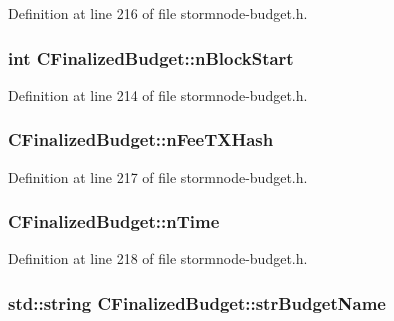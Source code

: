 Definition at line 216 of file stormnode-\/budget.\+h.

\hypertarget{class_c_finalized_budget_a1d04c262e10f4588b17eb3aba5ed9b52}{}
\subsubsection[{n\+Block\+Start}]{\setlength{\rightskip}{0pt plus 5cm}int C\+Finalized\+Budget\+::n\+Block\+Start}\label{class_c_finalized_budget_a1d04c262e10f4588b17eb3aba5ed9b52}


Definition at line 214 of file stormnode-\/budget.\+h.

\hypertarget{class_c_finalized_budget_a699a2f3cbea723957c2a944b08484bb5}{}
\subsubsection[{n\+Fee\+T\+X\+Hash}]{ C\+Finalized\+Budget\+::n\+Fee\+T\+X\+Hash}\label{class_c_finalized_budget_a699a2f3cbea723957c2a944b08484bb5}


Definition at line 217 of file stormnode-\/budget.\+h.

\hypertarget{class_c_finalized_budget_a3bb3cb1d44021d5ef9996a81f3e09734}{}
\subsubsection[{n\+Time}]{ C\+Finalized\+Budget\+::n\+Time}\label{class_c_finalized_budget_a3bb3cb1d44021d5ef9996a81f3e09734}


Definition at line 218 of file stormnode-\/budget.\+h.

\hypertarget{class_c_finalized_budget_ae2a467abad2985ff3c32b29fc75500aa}{}
\subsubsection[{str\+Budget\+Name}]{\setlength{\rightskip}{0pt plus 5cm}std\+::string C\+Finalized\+Budget\+::str\+Budget\+Name}\label{class_c_finalized_budget_ae2a467abad2985ff3c32b29fc75500aa}



